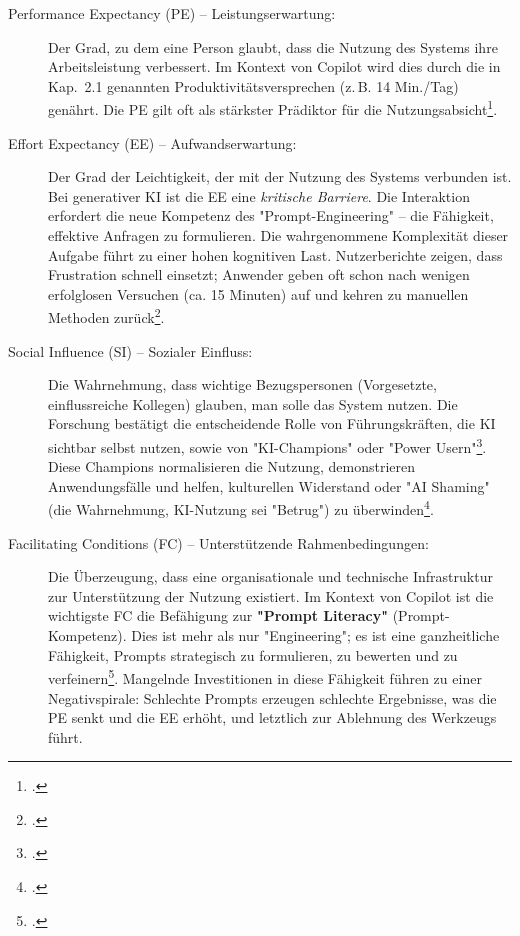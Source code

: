 \documentclass[12pt,a4paper,oneside]{article} %
\begin{document}
\begin{description}
    \item[Performance Expectancy (PE) – Leistungserwartung:] Der Grad, zu dem eine Person glaubt, dass die Nutzung des Systems ihre Arbeitsleistung verbessert. Im Kontext von Copilot wird dies durch die in Kap.~2.1 genannten Produktivitätsversprechen (z.\,B. 14 Min./Tag) genährt. Die PE gilt oft als stärkster Prädiktor für die Nutzungsabsicht\footcite{UTAUT2_Students_Cedtech2025}.

    \item[Effort Expectancy (EE) – Aufwandserwartung:] Der Grad der Leichtigkeit, der mit der Nutzung des Systems verbunden ist. Bei generativer KI ist die EE eine \textit{kritische Barriere}. Die Interaktion erfordert die neue Kompetenz des "Prompt-Engineering" – die Fähigkeit, effektive Anfragen zu formulieren. Die wahrgenommene Komplexität dieser Aufgabe führt zu einer hohen kognitiven Last. Nutzerberichte zeigen, dass Frustration schnell einsetzt; Anwender geben oft schon nach wenigen erfolglosen Versuchen (ca. 15 Minuten) auf und kehren zu manuellen Methoden zurück\footcite{Arxiv2025BeyondTraining}.

    \item[Social Influence (SI) – Sozialer Einfluss:] Die Wahrnehmung, dass wichtige Bezugspersonen (Vorgesetzte, einflussreiche Kollegen) glauben, man solle das System nutzen. Die Forschung bestätigt die entscheidende Rolle von Führungskräften, die KI sichtbar selbst nutzen, sowie von "KI-Champions" oder "Power Usern"\footcite{SloanReview2025ScaleGenAI}. Diese Champions normalisieren die Nutzung, demonstrieren Anwendungsfälle und helfen, kulturellen Widerstand oder "AI Shaming" (die Wahrnehmung, KI-Nutzung sei "Betrug") zu überwinden\footcite{SloanReview2025ScaleGenAI}.

    \item[Facilitating Conditions (FC) – Unterstützende Rahmenbedingungen:] Die Überzeugung, dass eine organisationale und technische Infrastruktur zur Unterstützung der Nutzung existiert. Im Kontext von Copilot ist die wichtigste FC die Befähigung zur \textbf{"Prompt Literacy"} (Prompt-Kompetenz). Dies ist mehr als nur "Engineering"; es ist eine ganzheitliche Fähigkeit, Prompts strategisch zu formulieren, zu bewerten und zu verfeinern\footcite{Monash2025PromptLiteracy}. Mangelnde Investitionen in diese Fähigkeit führen zu einer Negativspirale: Schlechte Prompts erzeugen schlechte Ergebnisse, was die PE senkt und die EE erhöht, und letztlich zur Ablehnung des Werkzeugs führt.
\end{description}
\end{document}
